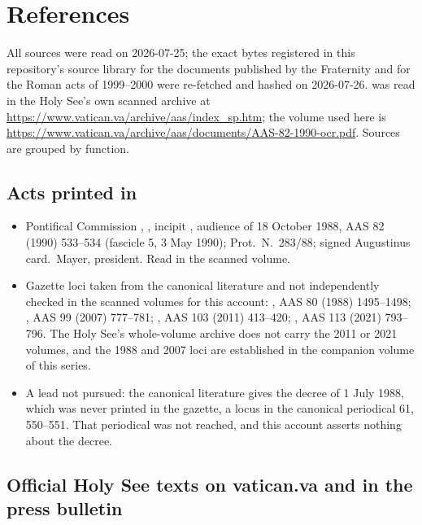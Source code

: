 \section{References}

All sources were read on 2026-07-25; the exact bytes registered in this
repository's source library for the documents published by the Fraternity
and for the Roman acts of 1999--2000 were re-fetched and hashed on
2026-07-26.  was
read in the Holy See's own scanned archive at
\url{https://www.vatican.va/archive/aas/index_sp.htm}; the volume used
here is
\url{https://www.vatican.va/archive/aas/documents/AAS-82-1990-ocr.pdf}.
Sources are grouped by function.

\subsection*{Acts printed in }

\begin{itemize}
\item Pontifical Commission , , incipit
, audience of 18 October 1988, AAS 82 (1990)
533--534 (fascicle 5, 3 May 1990); Prot.\ N.~283/88; signed Augustinus
card.\ Mayer, president. Read in the scanned volume.
\item Gazette loci taken from the canonical literature and not
independently checked in the scanned volumes for this account:
, AAS 80 (1988) 1495--1498; , AAS 99 (2007) 777--781; , AAS 103
(2011) 413--420; , AAS 113 (2021) 793--796. The
Holy See's whole-volume archive does not carry the 2011 or 2021 volumes,
and the 1988 and 2007 loci are established in the companion volume of this
series.
\item A lead not pursued: the canonical literature gives the decree
 of 1 July 1988, which was never printed
in the gazette, a locus in the canonical periodical  61,
550--551. That periodical was not reached, and this account asserts
nothing about the decree.
\end{itemize}

\subsection*{Official Holy See texts on vatican.va and in the press bulletin}

